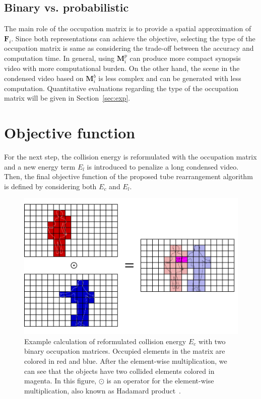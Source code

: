 \documentclass[11pt]{hyu_thesis}
\begin{document}
\subsection{Binary vs. probabilistic}
The main role of the occupation matrix is to provide a spatial approximation of $\textbf{F}_i$. Since both representations can achieve the objective, selecting the type of the occupation matrix is same as considering the trade-off between the accuracy and computation time. In general, using $\textbf{M}_i^p$ can produce more compact synopsis video with more computational burden. On the other hand, the scene in the condensed video based on $\textbf{M}_i^b$ is less complex and can be generated with less computation. Quantitative evaluations regarding the type of the occupation matrix will be given in Section~\ref{sec:exp}.

\section{Objective function}
For the next step, the collision energy is reformulated with the occupation matrix and a new energy term $E_l$ is introduced to penalize a long condensed video. Then, the final objective function of the proposed tube rearrangement algorithm is defined by considering both $E_c$ and $E_l$. 
\begin{figure}
	\centering
	\includegraphics[width=0.8\linewidth]{hadamard-prod.pdf}
	\caption{Example calculation of reformulated collision energy $E_c$ with two binary occupation matrices. Occupied elements in the matrix are colored in red and blue. After the element-wise multiplication, we can see that the objects have two collided elements colored in magenta. In this figure, $\odot$ is an operator for the element-wise multiplication, also known as Hadamard product~\cite{}.}
	\label{fig:hadamard_prod}
\end{figure}
\end{document}
